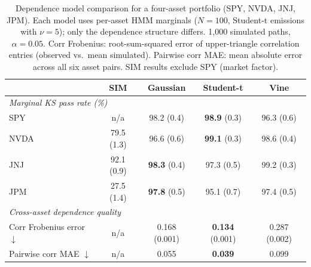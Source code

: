 \begin{table}[tp]
\centering
\caption{Dependence model comparison for a four-asset portfolio (SPY, NVDA, JNJ, JPM).
    Each model uses per-asset HMM marginals ($N=100$, Student-t emissions with $\nu=5$);
    only the dependence structure differs.
    1{,}000 simulated paths, $\alpha=0.05$.
    Corr Frobenius: root-sum-squared error of upper-triangle correlation entries
    (observed vs.\ mean simulated). Pairwise corr MAE: mean absolute error across
    all six asset pairs. SIM results exclude SPY (market factor).}
\label{tab:copula_comparison}
\small
\begin{tabular}{@{}lcccc@{}}
\toprule
 & \textbf{SIM} & \textbf{Gaussian} & \textbf{Student-t} & \textbf{Vine} \\ \midrule
\multicolumn{5}{l}{\textit{Marginal KS pass rate (\%)}} \\[2pt]
SPY   & n/a           & 98.2 (0.4) & \textbf{98.9} (0.3) & 96.3 (0.6) \\
NVDA  & 79.5 (1.3)    & 96.6 (0.6) & \textbf{99.1} (0.3) & 98.6 (0.4) \\
JNJ   & 92.1 (0.9)    & \textbf{98.3} (0.4) & 97.3 (0.5) & 99.2 (0.3) \\
JPM   & 27.5 (1.4)    & \textbf{97.8} (0.5) & 95.1 (0.7) & 97.4 (0.5) \\[4pt]
\multicolumn{5}{l}{\textit{Cross-asset dependence quality}} \\[2pt]
Corr Frobenius error $\downarrow$  & n/a  & 0.168 (0.001) & \textbf{0.134} (0.001) & 0.287 (0.002) \\
Pairwise corr MAE $\downarrow$     & n/a  & 0.055         & \textbf{0.039}         & 0.099         \\
\bottomrule
\end{tabular}
\end{table}

